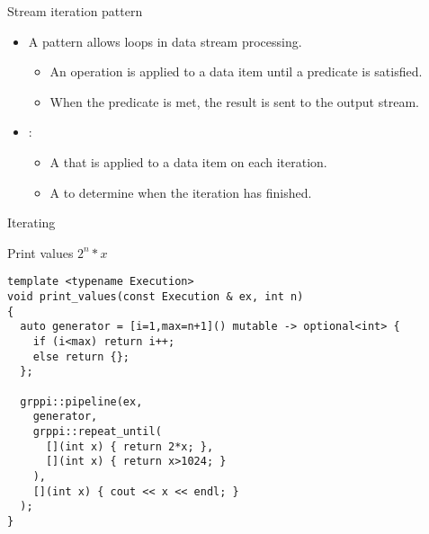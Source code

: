 \begin{frame}[t]{Stream iteration pattern}
\begin{itemize}
  \item A  pattern allows loops in data stream processing.
    \begin{itemize}
      \item An operation is applied to a data item until a predicate is satisfied.
      \item When the predicate is met, the result is sent to the output stream.
    \end{itemize}
  \vfill\pause
  \item {}:
    \begin{itemize}
      \item A  that is applied to a data item on each iteration.
      \item A  to determine when the iteration has finished.
    \end{itemize}
\end{itemize}
\end{frame}

\begin{frame}[t,fragile]{Iterating}
\begin{block}{Print values $2^n*x$}
\begin{lstlisting}
template <typename Execution>
void print_values(const Execution & ex, int n)
{
  auto generator = [i=1,max=n+1]() mutable -> optional<int> {
    if (i<max) return i++;
    else return {};
  };

  grppi::pipeline(ex,
    generator,
    grppi::repeat_until(
      [](int x) { return 2*x; },
      [](int x) { return x>1024; }
    ),
    [](int x) { cout << x << endl; }
  );
}
\end{lstlisting}
\end{block}
\end{frame}
